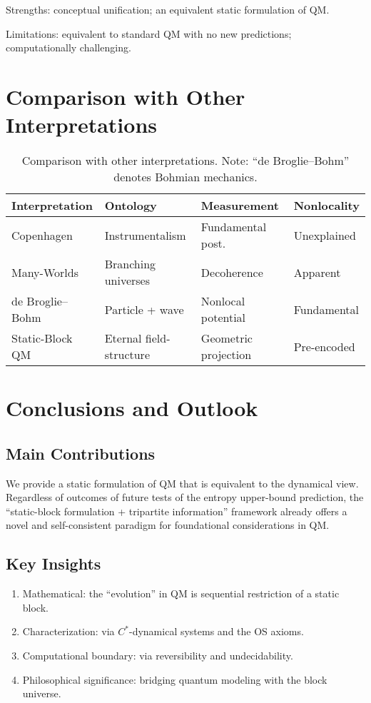 \documentclass[11pt]{article}
\theoremstyle{definition}
\theoremstyle{remark}
\begin{document}
Strengths: conceptual unification; an equivalent static formulation of QM.

Limitations: equivalent to standard QM with no new predictions; computationally challenging.

\section{Comparison with Other Interpretations}\label{sec:comparison}

\begin{table}[h]
\centering
\begin{tabular}{@{}llll@{}}
\toprule
Interpretation & Ontology & Measurement & Nonlocality \\
\midrule
Copenhagen & Instrumentalism & Fundamental post. & Unexplained \\
Many-Worlds & Branching universes & Decoherence & Apparent \\
de Broglie--Bohm & Particle + wave & Nonlocal potential & Fundamental \\
Static-Block QM & Eternal field-structure & Geometric projection & Pre-encoded \\
\bottomrule
\end{tabular}
\caption{Comparison with other interpretations. Note: ``de Broglie--Bohm'' denotes Bohmian mechanics.}
\end{table}

\section{Conclusions and Outlook}\label{sec:conclusions}

\subsection{Main Contributions}

We provide a static formulation of QM that is equivalent to the dynamical view. Regardless of outcomes of future tests of the entropy upper-bound prediction, the ``static-block formulation + tripartite information'' framework already offers a novel and self-consistent paradigm for foundational considerations in QM.

\subsection{Key Insights}

\begin{enumerate}
\item Mathematical: the ``evolution'' in QM is sequential restriction of a static block.
\item Characterization: via \( C^* \)-dynamical systems and the OS axioms.
\item Computational boundary: via reversibility and undecidability.
\item Philosophical significance: bridging quantum modeling with the block universe.
\end{enumerate}
\end{document}
